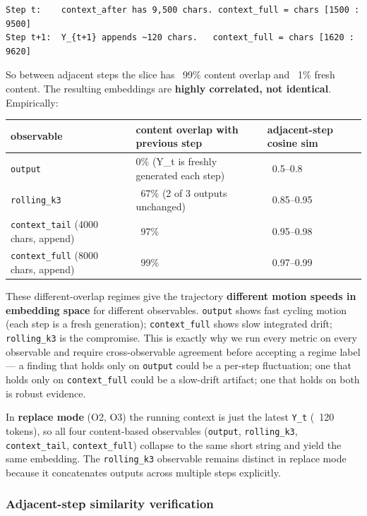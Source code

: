 \documentclass{article}
\theoremstyle{plain}
\theoremstyle{definition}
\begin{document}
\begin{verbatim}
Step t:    context_after has 9,500 chars. context_full = chars [1500 : 9500]
Step t+1:  Y_{t+1} appends ~120 chars.   context_full = chars [1620 : 9620]
\end{verbatim}

So between adjacent steps the slice has ~99\% content overlap and ~1\%
fresh content. The resulting embeddings are \textbf{highly correlated, not
identical}. Empirically:

\begin{table}[h!]
\centering
\small
\begin{tabular}{lll}
\toprule
observable & content overlap with previous step & adjacent-step cosine sim \\
\midrule
\texttt{output} & 0\% (Y\_t is freshly generated each step) & ~0.5–0.8 \\
\texttt{rolling\_k3} & ~67\% (2 of 3 outputs unchanged) & ~0.85–0.95 \\
\texttt{context\_tail} (4000 chars, append) & ~97\% & ~0.95–0.98 \\
\texttt{context\_full} (8000 chars, append) & ~99\% & ~0.97–0.99 \\
\bottomrule
\end{tabular}
\end{table}

These different-overlap regimes give the trajectory \textbf{different motion
speeds in embedding space} for different observables. \texttt{output} shows
fast cycling motion (each step is a fresh generation); \texttt{context\_full}
shows slow integrated drift; \texttt{rolling\_k3} is the compromise. This is
exactly why we run every metric on every observable and require
cross-observable agreement before accepting a regime label — a finding
that holds only on \texttt{output} could be a per-step fluctuation; one that
holds only on \texttt{context\_full} could be a slow-drift artifact; one that
holds on both is robust evidence.

In \textbf{replace mode} (O2, O3) the running context is just the latest
\texttt{Y\_t} (~120 tokens), so all four content-based observables (\texttt{output},
\texttt{rolling\_k3}, \texttt{context\_tail}, \texttt{context\_full}) collapse to the same
short string and yield the same embedding. The \texttt{rolling\_k3} observable
remains distinct in replace mode because it concatenates outputs across
multiple steps explicitly.

\subsubsection{Adjacent-step similarity verification}
\end{document}

